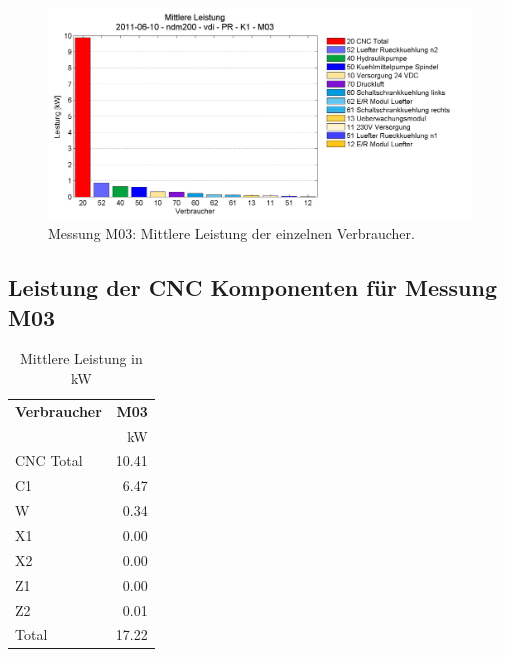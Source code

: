 \documentclass[a4paper,11pt,pdftex,twoside]{scrartcl}
\begin{document}
\begin{figure}[H]
\begin{center}
  \includegraphics[width=\columnwidth]{figures/2011-06-10_ndm200_vdi_PR_K1_M031_bar.png}
  \caption{Messung M03: Mittlere Leistung der einzelnen Verbraucher.}
  \label{fig:M03_bar}
\end{center}
\end{figure}
\pagebreak




\subsection{Leistung der CNC Komponenten f\"ur  Messung M03}



\begin{table}[H]
\begin{center}
\caption{Mittlere Leistung in kW}
\label{tab:meas_power}
\begin{tabular}{lr}
  {\bf Verbraucher}  & {\bf M03} \\
  & kW  \\
\hline
 CNC Total   & 10.41\\
 C1   & 6.47  \\
 W   & 0.34  \\
 X1   & 0.00  \\
 X2   & 0.00  \\
 Z1   & 0.00  \\
 Z2   & 0.01  \\
\hline
 Total  & 17.22  \\
\hline
\end{tabular}
\end{center}
\end{table}
\end{document}
